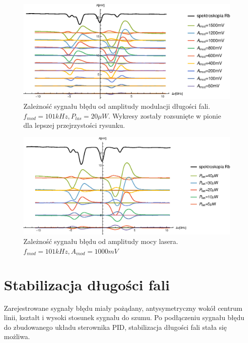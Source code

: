 \documentclass[a4paper,10pt,twoside]{report}
\begin{document}
\begin{figure}[h!]
\centering
 \includegraphics[width=\textwidth]{panoramy_1H_oda.eps}
 \caption{Zależność sygnału błędu od amplitudy modulacji długości fali. $f_{mod}=101kHz, P_{las}=20 \mu W$. Wykresy zostały rozsunięte w pionie dla lepszej przejrzystości rysunku.}
 \label{fig:panoda}
\end{figure}

\begin{figure}[h!]
\centering
 \includegraphics[width=\textwidth]{panoramy_1H_odp.eps}
 \caption{Zależność sygnału błędu od amplitudy mocy lasera. $f_{mod}=101kHz, A_{mod}=1000mV$}
 \label{fig:panodp}
\end{figure}

\section{Stabilizacja długości fali}
Zarejestrowane sygnały błędu miały pożądany, antysymetryczny wokół centrum linii, kształt i wysoki stosunek sygnału do szumu.  
Po podłączeniu sygnału błędu do zbudowanego układu sterownika PID, stabilizacja długości fali stała się możliwa.
\end{document}
